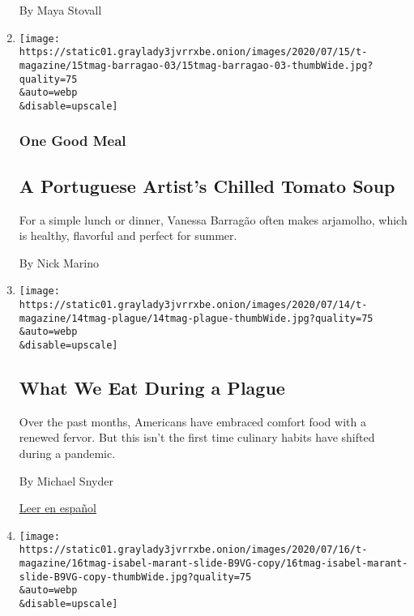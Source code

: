 \begin{enumerate}
  By Maya Stovall
\item
  \href{/2020/07/17/t-magazine/summer-recipes-arjamolho-soup-vanessa-barragao.html}{}

  \texttt{[image: https://static01.graylady3jvrrxbe.onion/images/2020/07/15/t-magazine/15tmag-barragao-03/15tmag-barragao-03-thumbWide.jpg?quality=75\\\&auto=webp\\\&disable=upscale]}

  \hypertarget{one-good-meal-1}{%
  \subsubsection{One Good Meal}\label{one-good-meal-1}}

  \hypertarget{a-portuguese-artists-chilled-tomato-soup}{%
  \subsection{A Portuguese Artist's Chilled Tomato
  Soup}\label{a-portuguese-artists-chilled-tomato-soup}}

  For a simple lunch or dinner, Vanessa Barragão often makes arjamolho,
  which is healthy, flavorful and perfect for summer.

  By Nick Marino
\item
  \href{/2020/07/16/t-magazine/eating-food-during-plague.html}{}

  \texttt{[image: https://static01.graylady3jvrrxbe.onion/images/2020/07/14/t-magazine/14tmag-plague/14tmag-plague-thumbWide.jpg?quality=75\\\&auto=webp\\\&disable=upscale]}

  \hypertarget{what-we-eat-during-a-plague}{%
  \subsection{What We Eat During a
  Plague}\label{what-we-eat-during-a-plague}}

  Over the past months, Americans have embraced comfort food with a
  renewed fervor. But this isn't the first time culinary habits have
  shifted during a pandemic.

  By Michael Snyder

  \href{https://www.nytimes3xbfgragh.onion/es/2020/07/23/t-magazine/comida-pandemia.html}{Leer
  en español}
\item
  \href{/2020/07/16/t-magazine/isabel-marant.html}{}

  \texttt{[image: https://static01.graylady3jvrrxbe.onion/images/2020/07/16/t-magazine/16tmag-isabel-marant-slide-B9VG-copy/16tmag-isabel-marant-slide-B9VG-copy-thumbWide.jpg?quality=75\\\&auto=webp\\\&disable=upscale]}


\end{enumerate}
